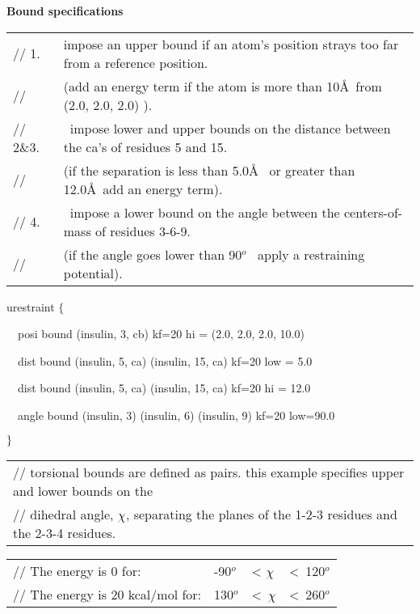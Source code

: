 {\bf Bound specifications}

\begin{tabular}{ll}
{\footnotesize // 1. } & {\footnotesize impose an upper bound if an atom's
position strays too far from a reference position.} \\ 
{\footnotesize // } & {\footnotesize (add an energy term if the atom is more
than 10\AA\ {}from (2.0, 2.0, 2.0) ).} \\ 
{\footnotesize // 2\&3.} & {\footnotesize \ impose lower and upper bounds on
the distance between the ca's of residues 5 and 15.} \\ 
{\footnotesize //} & {\footnotesize (if the separation is less than 5.0\AA\ %
{}or greater than 12.0\AA\ {}add an energy term).} \\ 
{\footnotesize // 4.} & {\footnotesize \ impose a lower bound on the angle
between the centers-of-mass of residues 3-6-9.} \\ 
{\footnotesize //} & {\footnotesize (if the angle goes lower than 90}$^{o}$%
{\footnotesize \ apply a restraining potential).}
\end{tabular}

urestraint $\{$

~~posi bound (insulin, 3, cb) kf=20 hi = (2.0, 2.0, 2.0, 10.0)

~~dist bound (insulin, 5, ca) (insulin, 15, ca) kf=20 low = 5.0

~~dist bound (insulin, 5, ca) (insulin, 15, ca) kf=20 hi = 12.0

~~angle bound (insulin, 3) (insulin, 6) (insulin, 9) kf=20 low=90.0

$\}\bigskip $

\begin{tabular}{l}
{\footnotesize // torsional bounds are defined as pairs. this example
specifies upper and lower bounds on the} \\ 
{\footnotesize // dihedral angle, }$\chi ${\footnotesize {}, separating the
planes of the 1-2-3 residues and the 2-3-4 residues.}
\end{tabular}

\begin{tabular}{llll}
{\footnotesize // The energy is 0 for:} & {\footnotesize -90}$^{o}$ & 
{\footnotesize < }$\chi $ & {\footnotesize <\ 120}$%
^{o}$ \\ 
{\footnotesize // The energy is 20 kcal/mol for:} & {\footnotesize 130}$^{o}$
& {\footnotesize <\ }$\chi $ & {\footnotesize <\
260}$^{o}$%
\end{tabular}

